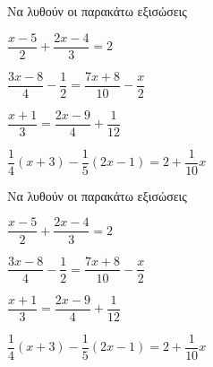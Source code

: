 Να λυθούν οι παρακάτω εξισώσεις
\begin{rlist}
\item $ \dfrac{x-5}{2}+\dfrac{2x-4}{3}=2 $
\item $ \dfrac{3x-8}{4}-\dfrac{1}{2}=\dfrac{7x+8}{10}-\dfrac{x}{2} $
\item $ \dfrac{x+1}{3}=\dfrac{2x-9}{4}+\dfrac{1}{12} $
\item $ \dfrac{1}{4}(x+3)-\dfrac{1}{5}(2x-1)=2+\dfrac{1}{10}x $
\end{rlist}
Να λυθούν οι παρακάτω εξισώσεις
\begin{rlist}
\item $ \dfrac{x-5}{2}+\dfrac{2x-4}{3}=2 $
\item $ \dfrac{3x-8}{4}-\dfrac{1}{2}=\dfrac{7x+8}{10}-\dfrac{x}{2} $
\item $ \dfrac{x+1}{3}=\dfrac{2x-9}{4}+\dfrac{1}{12} $
\item $ \dfrac{1}{4}(x+3)-\dfrac{1}{5}(2x-1)=2+\dfrac{1}{10}x $
\end{rlist}
